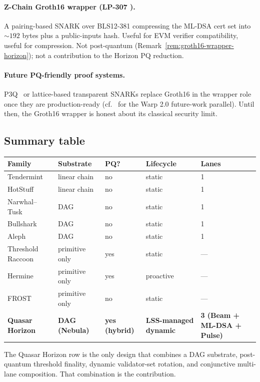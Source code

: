 \paragraph{Z-Chain Groth16 wrapper (LP-307 \cite{lp307}).} A pairing-based SNARK over BLS12-381 compressing the ML-DSA cert set into $\sim 192$ bytes plus a public-inputs hash. Useful for EVM verifier compatibility, useful for compression. Not post-quantum (Remark~\ref{rem:groth16-wrapper-horizon}); not a contribution to the Horizon PQ reduction.

\paragraph{Future PQ-friendly proof systems.} P3Q~\cite{luxp3q} or lattice-based transparent SNARKs replace Groth16 in the wrapper role once they are production-ready (cf.\ \cite{luxwarpv2} for the Warp 2.0 future-work parallel). Until then, the Groth16 wrapper is honest about its classical security limit.

\subsection{Summary table}

\begin{tabular}{@{}p{}p{}p{}p{}p{}@{}}
  \toprule
  \textbf{Family} & \textbf{Substrate} & \textbf{PQ?} & \textbf{Lifecycle} & \textbf{Lanes} \\
  \midrule
  Tendermint & linear chain & no & static & 1 \\
  HotStuff & linear chain & no & static & 1 \\
  Narwhal--Tusk & DAG & no & static & 1 \\
  Bullshark & DAG & no & static & 1 \\
  Aleph & DAG & no & static & 1 \\
  Threshold Raccoon & primitive only & yes & static & --- \\
  Hermine & primitive only & yes & proactive & --- \\
  FROST & primitive only & no & static & --- \\
  \textbf{Quasar Horizon} & \textbf{DAG (Nebula)} & \textbf{yes (hybrid)} & \textbf{LSS-managed dynamic} & \textbf{3 (Beam + ML-DSA + Pulse)} \\
  \bottomrule
\end{tabular}

The Quasar Horizon row is the only design that combines a DAG substrate, post-quantum threshold finality, dynamic validator-set rotation, and conjunctive multi-lane composition. That combination is the contribution.
